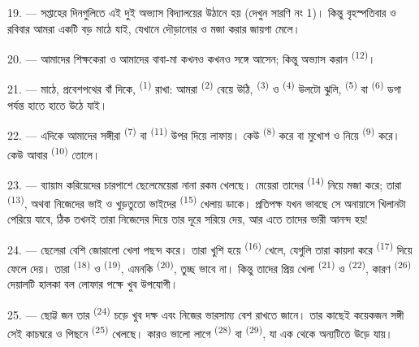 19. --- সপ্তাহের দিনগুলিতে এই দুই অভ্যাস বিদ্যালয়ের উঠানে হয় (দেখুন
সারণি নং 1)। কিন্তু বৃহস্পতিবার ও রবিবার আমরা একটি বড় মাঠে যাই, যেখানে
দৌড়ানোর ও মজা করার জায়গা মেলে।

20. --- আমাদের শিক্ষকেরা ও আমাদের বাবা-মা কখনও কখনও সঙ্গে আসেন; কিন্তু
অভ্যাস করান  \textsuperscript{(12)}।

21. --- মাঠে, প্রবেশপথের বাঁ দিকে, 
\textsuperscript{(1)} রাখা: আমরা  \textsuperscript{(2)} বেয়ে উঠি,
 \textsuperscript{(3)} ও  \textsuperscript{(4)}
উলটো ঝুলি,  \textsuperscript{(5)} বা  \textsuperscript{(6)} ডগা পর্যন্ত হাতে হাতে উঠে যাই।

22. --- এদিকে আমাদের সঙ্গীরা  \textsuperscript{(7)} বা
 \textsuperscript{(11)} উপর দিয়ে লাফায়। কেউ
 \textsuperscript{(8)} করে বা মুখোশ ও  নিয়ে
 \textsuperscript{(9)} করে। কেউ আবার 
\textsuperscript{(10)} তোলে।

\VUsaut{4.6mm}
\VUsaut{3.0mm}

23. --- ব্যায়াম করিয়েদের চারপাশে ছেলেমেয়েরা নানা রকম 
খেলছে। মেয়েরা তাদের  \textsuperscript{(14)} নিয়ে মজা করে; তারা
 \textsuperscript{(13)}, অথবা নিজেদের ভাই ও খুড়তুতো ভাইদের
 \textsuperscript{(15)} খেলায় ডাকে। প্রতিপক্ষ যখন ভাবছে সে
অনায়াসে খিলানটা পেরিয়ে যাবে, ঠিক তখনই তারা নিজেদের  দিয়ে তার  দূরে সরিয়ে দেয়, আর এতে তাদের ভারী আনন্দ হয়!

24. --- ছেলেরা বেশি জোরালো খেলা পছন্দ করে। তারা খুশি হয়ে 
\textsuperscript{(16)} খেলে, যেগুলি তারা কায়দা করে  \textsuperscript{(17)}
দিয়ে ফেলে দেয়। তারা  \textsuperscript{(18)} ও
 \textsuperscript{(19)}, এমনকি 
\textsuperscript{(20)}, তুচ্ছ ভাবে না। কিন্তু তাদের প্রিয় খেলা 
\textsuperscript{(21)} ও  \textsuperscript{(22)}, কারণ
 \textsuperscript{(26)} দেয়ালটি হালকা বল লোফার পক্ষে খুব
উপযোগী।

25. --- ছোট্ট জন তার  \textsuperscript{(24)} চড়ে খুব দক্ষ এবং
নিজের ভারসাম্য বেশ রাখতে জানে। তার কাছেই কয়েকজন সঙ্গী সেই কাচঘরে ও
 পিছনে  \textsuperscript{(25)} খেলছে। কারও ভালো
লাগে  \textsuperscript{(28)} বা 
\textsuperscript{(29)}, যা এক  থেকে অন্যটিতে উড়ে যায়।

